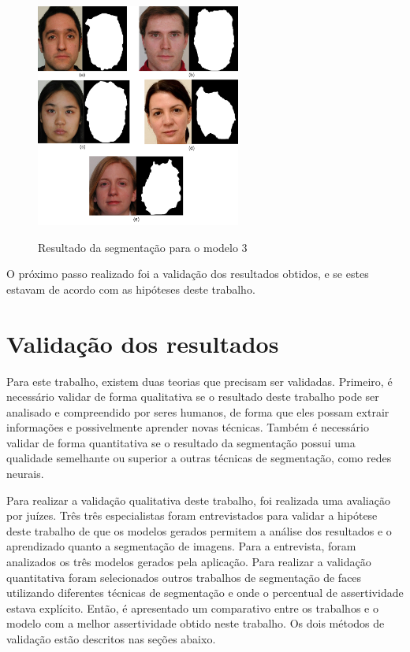 \documentclass[12pt,oneside,a4paper,english,french,spanish,brazil,]{abntex2}
\begin{document}
\begin{figure}[ht]
\centering
\caption{Resultado da segmentação para o modelo 3}
\includegraphics[width=0.6\textwidth]{imagens/DES_Resultado_3.pdf}
\sourceAuthor{}
\label{fig:DES_Resultado_3}
\end{figure}

O próximo passo realizado foi a validação dos resultados obtidos, e se estes estavam de acordo com as hipóteses deste trabalho.

\section{Validação dos resultados}

Para este trabalho, existem duas teorias que precisam ser validadas. Primeiro, é necessário validar de forma qualitativa se o resultado deste trabalho pode ser analisado e compreendido por seres humanos, de forma que eles possam extrair informações e possivelmente aprender novas técnicas. Também é necessário validar de forma quantitativa se o resultado da segmentação possui uma qualidade semelhante ou superior a outras técnicas de segmentação, como redes neurais.

Para realizar a validação qualitativa deste trabalho, foi realizada uma avaliação por juízes. Três três especialistas foram entrevistados para validar a hipótese deste trabalho de que os modelos gerados permitem a análise dos resultados e o aprendizado quanto a segmentação de imagens. Para a entrevista, foram analizados os três modelos gerados pela aplicação. Para realizar a validação quantitativa foram selecionados outros trabalhos de segmentação de faces utilizando diferentes técnicas de segmentação e onde o percentual de assertividade estava explícito. Então, é apresentado um comparativo entre os trabalhos e o modelo com a melhor assertividade obtido neste trabalho. Os dois métodos de validação estão descritos nas seções abaixo.
\end{document}
